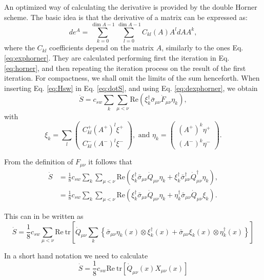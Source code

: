 \documentclass[12pt]{article}
\newcommand{\tr}{\mathrm{tr}}
\newcommand{\re}{\mathrm{Re}}
\begin{document}
An optimized way of calculating the derivative is provided by the double Horner scheme. The basic idea is that the derivative of a matrix can be expressed as:
\begin{equation}
d e^A = \sum_{k=0}^{\dim A -1} \sum_{l=0}^{\dim A-1} C_{kl}(A) A^l dA A^k, \label{eq:dexphorner}
\end{equation} 
where  the $C_{kl}$ coefficients depend on the matrix $A$, similarly to the ones Eq. \ref{eq:exphorner}. They are calculated performing first the iteration in Eq. \ref{eq:horner}, and then repeating the iteration process on the result of the first iteration. For compactness, we shall omit the limits of the sum henceforth. When inserting Eq. \eqref{eq:Hsw} in Eq. \eqref{eq:dotS}, and using Eq. \eqref{eq:dexphorner}, we obtain
\begin{equation}
 \dot{S} = c_{sw} \sum_{k}  \sum_{\mu<\nu}\re(  \xi_k^\dagger\bar{\sigma}_{\mu\nu}\dot{F}_{\mu\nu}\eta_k),
\end{equation}
with 
\begin{equation}
\xi_k = \sum_l \begin{pmatrix}
C^+_{kl} (A^+)^l \xi^+ \\
C^-_{kl} (A^-)^l \xi^-
\end{pmatrix}, \text{ and } 
\eta_k =  \begin{pmatrix}
 (A^+)^k \eta^+ \\
(A^-)^k \eta^-
\end{pmatrix}.
\end{equation}


From the definition of $F_{\mu\nu}$ it follows that
\begin{align}
 \dot{S} &=  \frac{1}{8}c_{sw}\sum_k \sum_{\mu<\nu}\re(\xi_k^\dagger\bar{\sigma}_{\mu\nu}\dot{Q}_{\mu\nu}\eta_k + \xi_k^\dagger\bar{\sigma}_{\mu\nu}^\dagger\dot{Q}_{\mu\nu}^\dagger\eta_k), \\
 &=
 \frac{1}{8}c_{sw}\sum_k \sum_{\mu<\nu}\re(\xi_k^\dagger\bar{\sigma}_{\mu\nu}\dot{Q}_{\mu\nu}\eta_k + \eta_k^\dagger\bar{\sigma}_{\mu\nu}\dot{Q}_{\mu\nu}\xi_k).
\end{align}

This can in be written as
\begin{equation}
 \dot{S} = \frac{1}{8}c_{sw}\sum_{\mu<\nu} \re~\tr\left[\dot{Q}_{\mu\nu} \sum_k\left\{\bar{\sigma}_{\mu\nu}\eta_k(x)\otimes\xi_k^\dagger(x) + \bar{\sigma}_{\mu\nu}\xi_k(x)\otimes\eta_k^\dagger(x)\right\}\right]
\end{equation}

In a short hand notation we need to calculate
\begin{equation}
 \dot{S} = \frac{1}{8}c_{sw}\re~\tr[\dot{Q}_{\mu\nu}(x)X_{\mu\nu}(x)]
 \label{eq:force}
\end{equation}
\end{document}
